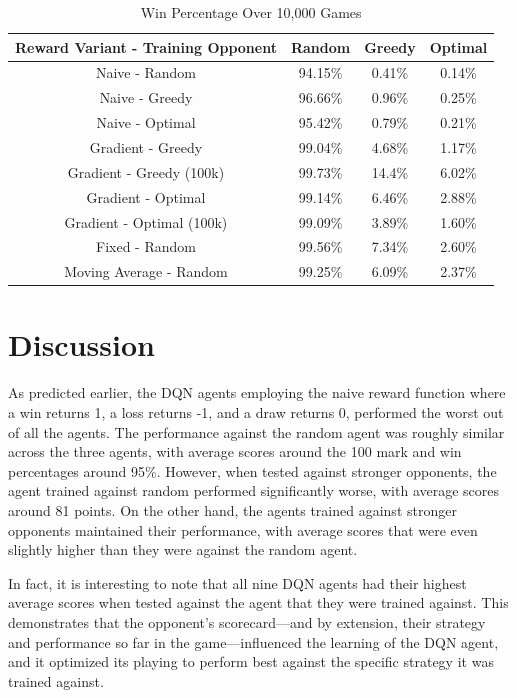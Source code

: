 \documentclass[12pt]{article}
\begin{document}
\begin{table}[H]
    \centering
    \caption*{Win Percentage Over 10,000 Games}
    \begin{tabular}{ |c|c|c|c| }
        \hline
        Reward Variant - Training Opponent & Random & Greedy & Optimal \\
        \hline
        Naive - Random & 94.15\% & 0.41\% & 0.14\% \\
        Naive - Greedy & 96.66\% & 0.96\% & 0.25\% \\
        Naive - Optimal & 95.42\% & 0.79\% & 0.21\% \\
        Gradient - Greedy & 99.04\% & 4.68\% & 1.17\% \\
        Gradient - Greedy (100k) & 99.73\% & 14.4\% & 6.02\% \\
        Gradient - Optimal & 99.14\% & 6.46\% & 2.88\% \\
        Gradient - Optimal (100k) & 99.09\% & 3.89\% & 1.60\% \\
        Fixed - Random & 99.56\% & 7.34\% & 2.60\% \\
        Moving Average - Random & 99.25\% & 6.09\% & 2.37\% \\
        \hline
    \end{tabular}
\end{table}

\section{Discussion}
As predicted earlier, the DQN agents employing the naive reward function where a win returns 1, a loss returns -1, and a draw returns 0, performed the worst out of all the agents. The performance against the random agent was roughly similar across the three agents, with average scores around the 100 mark and win percentages around 95\%. However, when tested against stronger opponents, the agent trained against random performed significantly worse, with average scores around 81 points. On the other hand, the agents trained against stronger opponents maintained their performance, with average scores that were even slightly higher than they were against the random agent.

In fact, it is interesting to note that all nine DQN agents had their highest average scores when tested against the agent that they were trained against. This demonstrates that the opponent's scorecard—and by extension, their strategy and performance so far in the game—influenced the learning of the DQN agent, and it optimized its playing to perform best against the specific strategy it was trained against.
\end{document}
